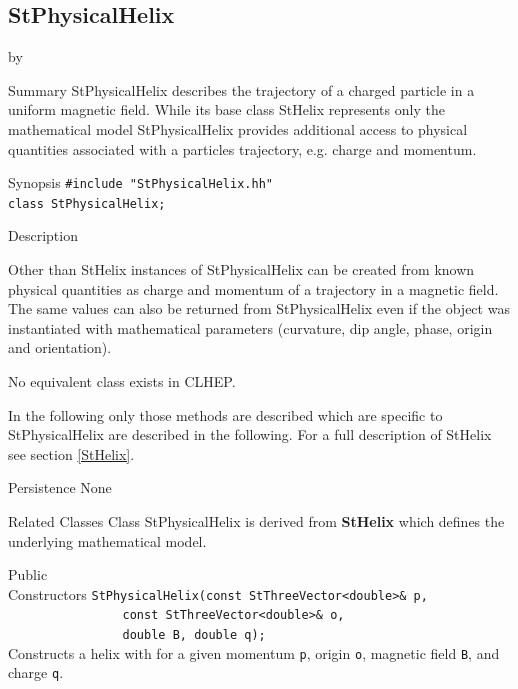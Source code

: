 \documentclass[twoside]{article}
\newcommand{\comp}[1]{\texttt{#1}}%
\newcommand{\entrylabel}[1]{\mbox{\textbf{{#1}}}\hfil}%
\newenvironment{entry}
{\begin{list}{}%
    {\renewcommand{\makelabel}{\entrylabel}%
     \setlength{\labelwidth}{90pt}%
     \setlength{\leftmargin}{\labelwidth}
     \advance\leftmargin by \labelsep%
      }%
    }%
  {\end{list}}
\newcommand{\Entrylabel}[1]%
{\raisebox{0pt}[1ex][0pt]{\makebox[\labelwidth][l]%
    {\parbox[t]{\labelwidth}{\hspace{0pt}\textbf{{#1}}}}}}
\newenvironment{Entry}%
{\renewcommand{\entrylabel}{\Entrylabel}\begin{entry}}%
  {\end{entry}}
\begin{document}
%
%
\subsection{StPhysicalHelix } \label{StPhysicalHelix}
\begin{Entry}
\item[Summary]
    StPhysicalHelix describes the trajectory of a charged particle in a
    uniform magnetic field. While its base class StHelix 
    represents only the mathematical model StPhysicalHelix provides
    additional access to physical quantities associated with a particles
    trajectory, e.g. charge and momentum.

\item[Synopsis]
    \verb+#include "StPhysicalHelix.hh"+\\
    \verb+class StPhysicalHelix;+    
    
\item[Description]   

    Other than StHelix instances of StPhysicalHelix can be created
    from known physical quantities as charge and momentum
    of a trajectory in a magnetic
    field. The same values can also be returned from
    StPhysicalHelix even if the object was instantiated with mathematical
    parameters (curvature, dip angle, phase, origin and orientation).
        
    No equivalent class exists in CLHEP.

    In the following only those methods are described which are specific
    to StPhysicalHelix are described in the following. For a full description of
    StHelix see section \ref{StHelix}.
    
\item[Persistence]
    None

\item[Related Classes]
    Class StPhysicalHelix is derived from {\bf StHelix}
    which defines the underlying mathematical model.
    
\item[Public\\ Constructors]
    \verb+StPhysicalHelix(const StThreeVector<double>& p, + \\
    \verb+                const StThreeVector<double>& o, + \\
    \verb+                double B, double q);+ \\
    Constructs a helix with for a given momentum \comp{p},
    origin \comp{o}, magnetic field \comp{B}, and charge \comp{q}.


\end{Entry}
\end{document}
